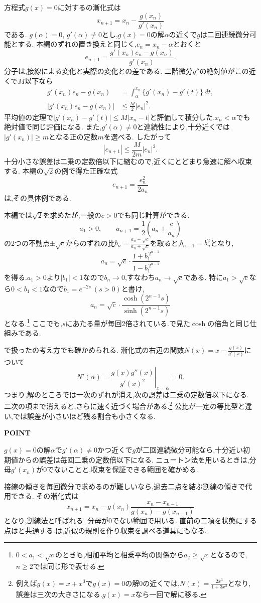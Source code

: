 方程式$g(x)=0$に対するの漸化式は
\[
  x_{n+1}=x_n-\frac{g(x_n)}{g'(x_n)}
\]
である.
$g(\alpha)=0$, $g'(\alpha)\ne0$とし,$g(x)=0$の解$\alpha$の近くで$g$は二回連続微分可能とする.
本編のずれの置き換えと同じく,$e_n=x_n-\alpha$とおくと
\[
  e_{n+1}
  =\frac{g'(x_n)e_n-g(x_n)}{g'(x_n)}.
\]
分子は,接線による変化と実際の変化との差である.
二階微分$g''$の絶対値がこの近くで$M$以下なら
\[
  \begin{aligned}
    g'(x_n)e_n-g(x_n)
    &=\int_\alpha^{x_n}\{g'(x_n)-g'(t)\}\,dt,\\
    |g'(x_n)e_n-g(x_n)|
    &\le \frac{M}{2}|e_n|^2.
  \end{aligned}
\]
平均値の定理で$|g'(x_n)-g'(t)|\le M|x_n-t|$と評価して積分した.$x_n<\alpha$でも絶対値で同じ評価になる.
また,$g'(\alpha)\ne0$と連続性により,十分近くでは$|g'(x_n)|\ge m$となる正の定数$m$を選べる.
したがって
\[
  |e_{n+1}|\le\frac{M}{2m}|e_n|^2.
\]
十分小さな誤差は二乗の定数倍以下に縮むので,近くにとどまり急速に解へ収束する.
本編の$\sqrt2$の例で得た正確な式
\[
  e_{n+1}=\frac{e_n^2}{2a_n}
\]
は,その具体例である.

本編では$\sqrt2$を求めたが,一般の$c>0$でも同じ計算ができる.
\[
  a_1>0,\qquad a_{n+1}=\frac12\left(a_n+\frac{c}{a_n}\right)
\]
の2つの不動点$\pm\sqrt c$からのずれの比$b_n=\frac{a_n-\sqrt c}{a_n+\sqrt c}$を取ると,$b_{n+1}=b_n^2$となり,
\[
  a_n=\sqrt c\cdot\frac{1+b_1^{\,2^{n-1}}}{1-b_1^{\,2^{n-1}}}
\]
を得る.$a_1>0$より$|b_1|<1$なので$b_n\to0$,すなわち$a_n\to\sqrt c$である.
特に$a_1>\sqrt c$なら$0<b_1<1$なので$b_1=e^{-2s}\ (s>0)$と書け,
\[
  a_n=\sqrt c\cdot\frac{\cosh(2^{n-1}s)}{\sinh(2^{n-1}s)}
\]
となる.\footnote{$0<a_1<\sqrt c$のときも,相加平均と相乗平均の関係から$a_2\ge\sqrt c$となるので,$n\ge2$では同じ形で表せる.}
ここでも,$s$にあたる量が毎回2倍されている.で見た$\cosh$の倍角と同じ仕組みである.

で扱ったの考え方でも確かめられる.
漸化式の右辺の関数$N(x)=x-\frac{g(x)}{g'(x)}$について
\[
  N'(\alpha)
  =\left.\frac{g(x)g''(x)}{g'(x)^2}\right|_{x=\alpha}=0.
\]
つまり,解のところでは一次のずれが消え,次の誤差は二乗の定数倍以下になる.
二次の項まで消えると,さらに速く近づく場合がある.\footnote{例えば$g(x)=x+x^3$で$g(x)=0$の解$0$の近くでは,$N(x)=\frac{2x^3}{1+3x^2}$となり,誤差は三次の大きさになる.$g(x)=x$なら一回で解に移る.}
公比が一定の等比型と違い,では誤差が小さいほど残る割合も小さくなる.

\begin{bookpoint}
  \textbf{POINT}\par
  $g(x)=0$の解$\alpha$で$g'(\alpha)\ne0$かつ近くで$g$が二回連続微分可能なら,十分近い初期値からの誤差は毎回二乗の定数倍以下になる.
  ニュートン法を用いるときは,分母$g'(x_n)$が0でないことと,収束を保証できる範囲を確かめる.
\end{bookpoint}

接線の傾きを毎回微分で求めるのが難しいなら,過去二点を結ぶ割線の傾きで代用できる.
その漸化式は
\[
  x_{n+1}
  =x_n-g(x_n)\frac{x_n-x_{n-1}}{g(x_n)-g(x_{n-1})}
\]
となり,割線法と呼ばれる.
分母が0でない範囲で用いる.
直前の二項を状態にする点はと共通する.は,近似の規則を作り収束を調べる道具にもなる.
